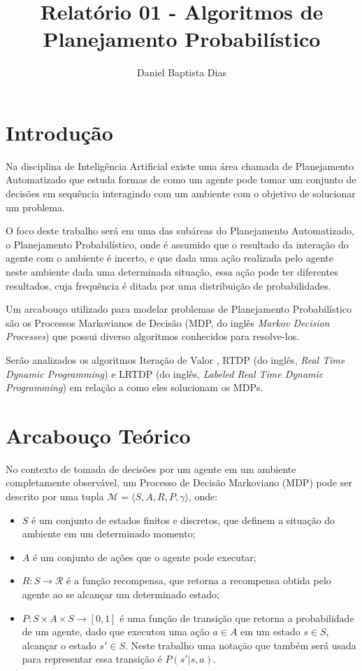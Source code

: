 \documentclass[letterpaper]{article}
\title{Relatório 01 - Algoritmos de Planejamento Probabilístico}
\author{Daniel Baptista Dias}
\begin{document}
\maketitle

\section{Introdução}
\label{sec:introducao}

Na disciplina de Inteligência Artificial existe uma área chamada de Planejamento Automatizado
que estuda formas de como um agente pode tomar um conjunto de decisões em sequência interagindo
com um ambiente com o objetivo de solucionar um problema.

O foco deste trabalho será em uma das subáreas do Planejamento Automatizado, o Planejamento Probabilístico, onde
é assumido que o resultado da interação do agente com o ambiente é incerto, e que dada uma ação realizada pelo agente
neste ambiente dada uma determinada situação, essa ação pode ter diferentes resultados, cuja frequência é ditada por
uma distribuição de probabilidades.

Um arcabouço utilizado para modelar problemas de Planejamento Probabilístico são os Processos Markovianos de Decisão
(MDP, do inglês \textit{Markov Decision Processes})\cite{Puterman-1994} que possui diverso algoritmos conhecidos para resolve-los.

Serão analizados os algoritmos Iteração de Valor \cite{Howard-1960}, RTDP (do inglês, \textit{Real Time Dynamic Programming})
\cite{BartoBradtkeSingh-1995} e LRTDP (do inglês, \textit{Labeled Real Time Dynamic Programming}) \cite{BonetGeffer-2003} em relação a como eles
solucionam os MDPs.

\section{Arcabouço Teórico}

No contexto de tomada de decisões por um agente em um ambiente completamente observável, um Processo de Decisão Markoviano (MDP)
pode ser descrito por uma tupla $\mathcal{M}=\langle S,A,R,P,\gamma \rangle$, onde:

\begin{itemize}
    \item $S$ é um conjunto de estados finitos e discretos, que definem a situação do ambiente em um determinado momento;
    \item $A$ é um conjunto de ações que o agente pode executar;
    \item $R : S \rightarrow \mathcal{R} $ é a função recompensa, que retorna a recompensa obtida pelo agente ao se alcançar um determinado estado;
    \item $P : S \times A \times S \rightarrow [0, 1]$ é uma função de transição que retorna a probabilidade de um agente, dado que executou uma ação $a \in A$ em um estado $s \in S$, alcançar o estado $s' \in S$. Neste trabalho uma notação que também será usada para representar essa transição é $P(s'|s,a)$.
\end{itemize}
\end{document}
